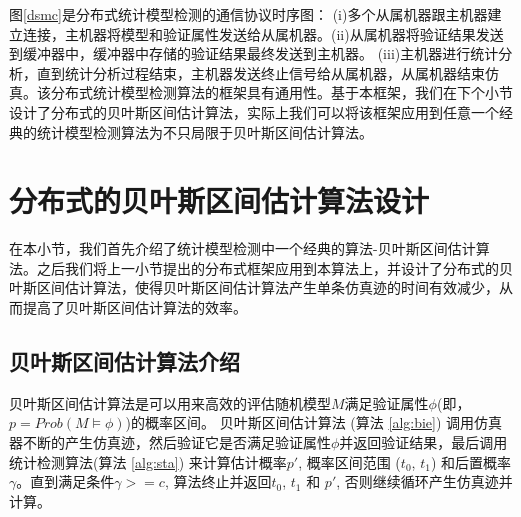 \begin{figure}[htbp]
\end{figure}
图\ref{dsmc}是分布式统计模型检测的通信协议时序图： (i)多个从属机器跟主机器建立连接，主机器将模型和验证属性发送给从属机器。(ii)从属机器将验证结果发送到缓冲器中，缓冲器中存储的验证结果最终发送到主机器。 (iii)主机器进行统计分析，直到统计分析过程结束，主机器发送终止信号给从属机器，从属机器结束仿真。该分布式统计模型检测算法的框架具有通用性。基于本框架，我们在下个小节设计了分布式的贝叶斯区间估计算法，实际上我们可以将该框架应用到任意一个经典的统计模型检测算法为不只局限于贝叶斯区间估计算法。
\section{分布式的贝叶斯区间估计算法设计}
\label{sec:dbie}
在本小节，我们首先介绍了统计模型检测中一个经典的算法-贝叶斯区间估计算法。之后我们将上一小节提出的分布式框架应用到本算法上，并设计了分布式的贝叶斯区间估计算法，使得贝叶斯区间估计算法产生单条仿真迹的时间有效减少，从而提高了贝叶斯区间估计算法的效率。
\subsection{贝叶斯区间估计算法介绍}
贝叶斯区间估计算法是可以用来高效的评估随机模型$M$满足验证属性$\phi$(即，$p=Prob(M\models\phi)$)的概率区间。 贝叶斯区间估计算法 (算法 \ref{alg:bie}) 调用仿真器不断的产生仿真迹，然后验证它是否满足验证属性$\phi$并返回验证结果，最后调用统计检测算法(算法 \ref{alg:sta}) 来计算估计概率$p'$, 概率区间范围 ($t_0$, $t_1$) 和后置概率$\gamma$。直到满足条件$\gamma >= c$, 算法终止并返回$t_0$, $t_1$ 和 $p'$, 否则继续循环产生仿真迹并计算。

